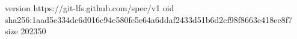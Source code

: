 version https://git-lfs.github.com/spec/v1
oid sha256:1aad5e334dc6d016c94e580fe5e64a6ddaf2433d51b6d2cf98f8663e418ee8f7
size 202350
